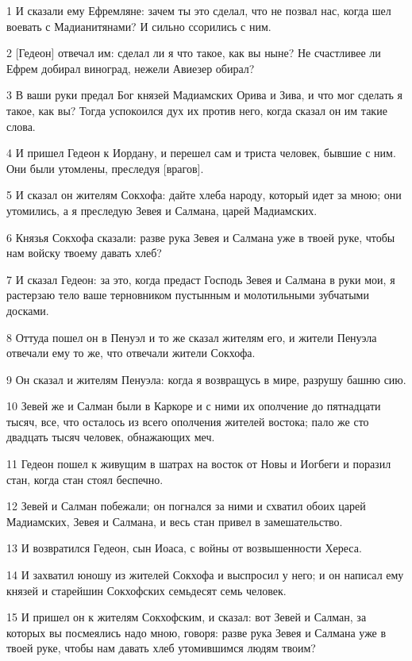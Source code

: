 \par 1 И сказали ему Ефремляне: зачем ты это сделал, что не позвал нас, когда шел воевать с Мадианитянами? И сильно ссорились с ним.
\par 2 [Гедеон] отвечал им: сделал ли я что такое, как вы ныне? Не счастливее ли Ефрем добирал виноград, нежели Авиезер обирал?
\par 3 В ваши руки предал Бог князей Мадиамских Орива и Зива, и что мог сделать я такое, как вы? Тогда успокоился дух их против него, когда сказал он им такие слова.
\par 4 И пришел Гедеон к Иордану, и перешел сам и триста человек, бывшие с ним. Они были утомлены, преследуя [врагов].
\par 5 И сказал он жителям Сокхофа: дайте хлеба народу, который идет за мною; они утомились, а я преследую Зевея и Салмана, царей Мадиамских.
\par 6 Князья Сокхофа сказали: разве рука Зевея и Салмана уже в твоей руке, чтобы нам войску твоему давать хлеб?
\par 7 И сказал Гедеон: за это, когда предаст Господь Зевея и Салмана в руки мои, я растерзаю тело ваше терновником пустынным и молотильными зубчатыми досками.
\par 8 Оттуда пошел он в Пенуэл и то же сказал жителям его, и жители Пенуэла отвечали ему то же, что отвечали жители Сокхофа.
\par 9 Он сказал и жителям Пенуэла: когда я возвращусь в мире, разрушу башню сию.
\par 10 Зевей же и Салман были в Каркоре и с ними их ополчение до пятнадцати тысяч, все, что осталось из всего ополчения жителей востока; пало же сто двадцать тысяч человек, обнажающих меч.
\par 11 Гедеон пошел к живущим в шатрах на восток от Новы и Иогбеги и поразил стан, когда стан стоял беспечно.
\par 12 Зевей и Салман побежали; он погнался за ними и схватил обоих царей Мадиамских, Зевея и Салмана, и весь стан привел в замешательство.
\par 13 И возвратился Гедеон, сын Иоаса, с войны от возвышенности Хереса.
\par 14 И захватил юношу из жителей Сокхофа и выспросил у него; и он написал ему князей и старейшин Сокхофских семьдесят семь человек.
\par 15 И пришел он к жителям Сокхофским, и сказал: вот Зевей и Салман, за которых вы посмеялись надо мною, говоря: разве рука Зевея и Салмана уже в твоей руке, чтобы нам давать хлеб утомившимся людям твоим?
